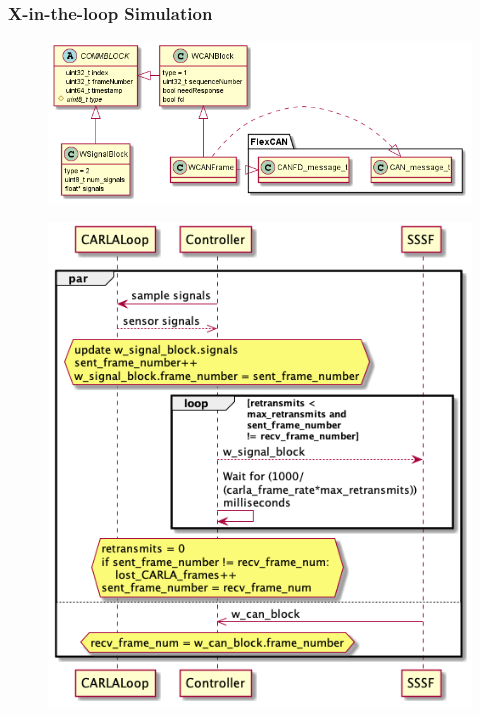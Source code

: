 \documentclass[letterpaper,twocolumn,12pt]{article}
\begin{document}
\subsubsection{X-in-the-loop Simulation}
\begin{figure}[t!]
    \centering
    \includegraphics[width=\linewidth]{out/images/data_structures/data_structures.png}
    
    \caption{}
    \label{fig:}
\end{figure}

\begin{figure}[t!]
    \centering
    \includegraphics[width=\linewidth]{out/images/signal_control/signal_control.png}
    \caption{}
    \label{fig:}
\end{figure}
\end{document}
